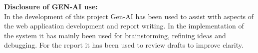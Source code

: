 \documentclass[12pt, a4paper]{article}
\begin{document}
\maketitle

\vspace{20mm} %


\begin{center}
{\large 
\textbf{Disclosure of GEN-AI use:} \\
\normalsize{In the development of this project Gen-AI has been used to assist with
aspects of the web application development and report writing. In the implementation
of the system it has mainly been used for brainstorming, refining ideas and debugging. 
For the report it has been used to review drafts to improve clarity.}}
\end{center}

\newpage
\tableofcontents
\newpage










% 
\end{document}
